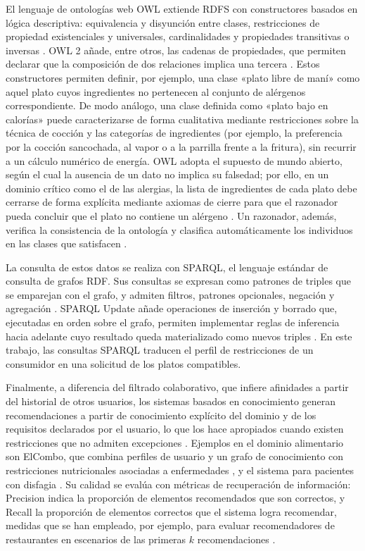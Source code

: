 \documentclass[conference]{IEEEtran}
\begin{document}
El lenguaje de ontologías web OWL extiende RDFS con constructores basados en lógica descriptiva: equivalencia y disyunción entre clases, restricciones de propiedad existenciales y universales, cardinalidades y propiedades transitivas o inversas \cite{allemang2008}. OWL 2 añade, entre otros, las cadenas de propiedades, que permiten declarar que la composición de dos relaciones implica una tercera \cite{hitzler2009}. Estos constructores permiten definir, por ejemplo, una clase «plato libre de maní» como aquel plato cuyos ingredientes no pertenecen al conjunto de alérgenos correspondiente. De modo análogo, una clase definida como «plato bajo en calorías» puede caracterizarse de forma cualitativa mediante restricciones sobre la técnica de cocción y las categorías de ingredientes (por ejemplo, la preferencia por la cocción sancochada, al vapor o a la parrilla frente a la fritura), sin recurrir a un cálculo numérico de energía. OWL adopta el supuesto de mundo abierto, según el cual la ausencia de un dato no implica su falsedad; por ello, en un dominio crítico como el de las alergias, la lista de ingredientes de cada plato debe cerrarse de forma explícita mediante axiomas de cierre para que el razonador pueda concluir que el plato no contiene un alérgeno \cite{allemang2008}. Un razonador, además, verifica la consistencia de la ontología y clasifica automáticamente los individuos en las clases que satisfacen \cite{hitzler2009}.

La consulta de estos datos se realiza con SPARQL, el lenguaje estándar de consulta de grafos RDF. Sus consultas se expresan como patrones de triples que se emparejan con el grafo, y admiten filtros, patrones opcionales, negación y agregación \cite{allemang2008}. SPARQL Update añade operaciones de inserción y borrado que, ejecutadas en orden sobre el grafo, permiten implementar reglas de inferencia hacia adelante cuyo resultado queda materializado como nuevos triples \cite{hitzler2009}. En este trabajo, las consultas SPARQL traducen el perfil de restricciones de un consumidor en una solicitud de los platos compatibles.

Finalmente, a diferencia del filtrado colaborativo, que infiere afinidades a partir del historial de otros usuarios, los sistemas basados en conocimiento generan recomendaciones a partir de conocimiento explícito del dominio y de los requisitos declarados por el usuario, lo que los hace apropiados cuando existen restricciones que no admiten excepciones \cite{palma2008}. Ejemplos en el dominio alimentario son ElCombo, que combina perfiles de usuario y un grafo de conocimiento con restricciones nutricionales asociadas a enfermedades \cite{xu2024}, y el sistema para pacientes con disfagia \cite{spoladore2024}. Su calidad se evalúa con métricas de recuperación de información: Precision indica la proporción de elementos recomendados que son correctos, y Recall la proporción de elementos correctos que el sistema logra recomendar, medidas que se han empleado, por ejemplo, para evaluar recomendadores de restaurantes en escenarios de las primeras $k$ recomendaciones \cite{asani2021}.
\end{document}
